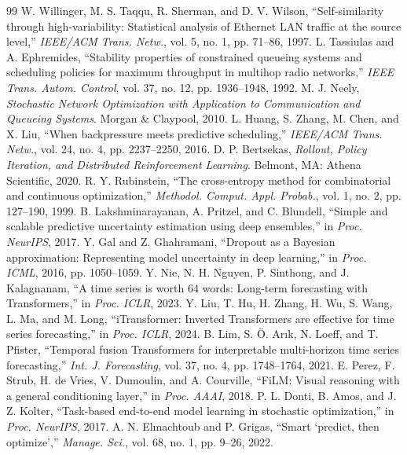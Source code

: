 \begin{thebibliography}{99}
 W. Willinger, M. S. Taqqu, R. Sherman, and D. V. Wilson, ``Self-similarity through high-variability: Statistical analysis of Ethernet LAN traffic at the source level,'' \emph{IEEE/ACM Trans. Netw.}, vol. 5, no. 1, pp. 71--86, 1997.
 L. Tassiulas and A. Ephremides, ``Stability properties of constrained queueing systems and scheduling policies for maximum throughput in multihop radio networks,'' \emph{IEEE Trans. Autom. Control}, vol. 37, no. 12, pp. 1936--1948, 1992.
 M. J. Neely, \emph{Stochastic Network Optimization with Application to Communication and Queueing Systems}. Morgan \& Claypool, 2010.
 L. Huang, S. Zhang, M. Chen, and X. Liu, ``When backpressure meets predictive scheduling,'' \emph{IEEE/ACM Trans. Netw.}, vol. 24, no. 4, pp. 2237--2250, 2016.
 D. P. Bertsekas, \emph{Rollout, Policy Iteration, and Distributed Reinforcement Learning}. Belmont, MA: Athena Scientific, 2020.
 R. Y. Rubinstein, ``The cross-entropy method for combinatorial and continuous optimization,'' \emph{Methodol. Comput. Appl. Probab.}, vol. 1, no. 2, pp. 127--190, 1999.
 B. Lakshminarayanan, A. Pritzel, and C. Blundell, ``Simple and scalable predictive uncertainty estimation using deep ensembles,'' in \emph{Proc. NeurIPS}, 2017.
 Y. Gal and Z. Ghahramani, ``Dropout as a Bayesian approximation: Representing model uncertainty in deep learning,'' in \emph{Proc. ICML}, 2016, pp. 1050--1059.
 Y. Nie, N. H. Nguyen, P. Sinthong, and J. Kalagnanam, ``A time series is worth 64 words: Long-term forecasting with Transformers,'' in \emph{Proc. ICLR}, 2023.
 Y. Liu, T. Hu, H. Zhang, H. Wu, S. Wang, L. Ma, and M. Long, ``iTransformer: Inverted Transformers are effective for time series forecasting,'' in \emph{Proc. ICLR}, 2024.
 B. Lim, S. \"O. Ar\i k, N. Loeff, and T. Pfister, ``Temporal fusion Transformers for interpretable multi-horizon time series forecasting,'' \emph{Int. J. Forecasting}, vol. 37, no. 4, pp. 1748--1764, 2021.
 E. Perez, F. Strub, H. de Vries, V. Dumoulin, and A. Courville, ``FiLM: Visual reasoning with a general conditioning layer,'' in \emph{Proc. AAAI}, 2018.
 P. L. Donti, B. Amos, and J. Z. Kolter, ``Task-based end-to-end model learning in stochastic optimization,'' in \emph{Proc. NeurIPS}, 2017.
 A. N. Elmachtoub and P. Grigas, ``Smart `predict, then optimize','' \emph{Manage. Sci.}, vol. 68, no. 1, pp. 9--26, 2022.

\end{thebibliography}
